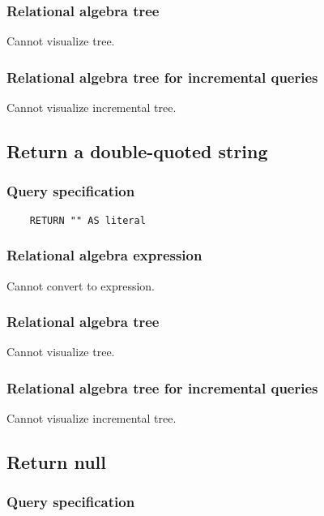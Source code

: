 	\subsubsection*{Relational algebra tree}

	Cannot visualize tree.

	\subsubsection*{Relational algebra tree for incremental queries}

	Cannot visualize incremental tree.
	\subsection{Return a double-quoted string}

	\subsubsection*{Query specification}

	\begin{lstlisting}
	RETURN "" AS literal
	\end{lstlisting}


	\subsubsection*{Relational algebra expression}

	Cannot convert to expression.

	\subsubsection*{Relational algebra tree}

	Cannot visualize tree.

	\subsubsection*{Relational algebra tree for incremental queries}

	Cannot visualize incremental tree.
	\subsection{Return null}

	\subsubsection*{Query specification}

